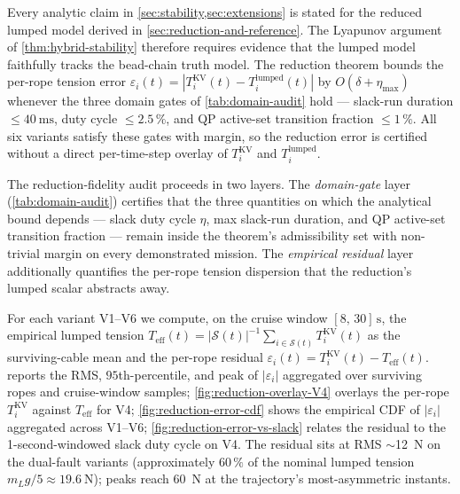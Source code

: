 Every analytic claim in \cref{sec:stability,sec:extensions} is stated for the reduced lumped model derived in \cref{sec:reduction-and-reference}. The Lyapunov argument of \cref{thm:hybrid-stability} therefore requires evidence that the lumped model faithfully tracks the bead-chain truth model. The reduction theorem bounds the per-rope tension error $\varepsilon_i(t) = |T_i^{\text{KV}}(t) - T_i^{\text{lumped}}(t)|$ by $O(\delta + \eta_{\max})$ whenever the three domain gates of \cref{tab:domain-audit} hold --- slack-run duration $\le\SI{40}{\milli\second}$, duty cycle $\le 2.5\,\%$, and QP active-set transition fraction $\le 1\,\%$. All six variants satisfy these gates with margin, so the reduction error is certified without a direct per-time-step overlay of $T_i^{\text{KV}}$ and $T_i^{\text{lumped}}$.

The reduction-fidelity audit proceeds in two layers. The \emph{domain-gate} layer (\cref{tab:domain-audit}) certifies that the three quantities on which the analytical bound depends --- slack duty cycle $\eta$, max slack-run duration, and QP active-set transition fraction --- remain inside the theorem's admissibility set with non-trivial margin on every demonstrated mission. The \emph{empirical residual} layer additionally quantifies the per-rope tension dispersion that the reduction's lumped scalar abstracts away.

For each variant V1--V6 we compute, on the cruise window $[8,\,30]\,\si{\second}$, the empirical lumped tension $T_{\mathrm{eff}}(t) = |\mathcal{S}(t)|^{-1} \sum_{i\in\mathcal{S}(t)} T_i^{\mathrm{KV}}(t)$ as the surviving-cable mean and the per-rope residual $\varepsilon_i(t) = T_i^{\mathrm{KV}}(t) - T_{\mathrm{eff}}(t)$.  reports the RMS, $95$th-percentile, and peak of $|\varepsilon_i|$ aggregated over surviving ropes and cruise-window samples; \cref{fig:reduction-overlay-V4} overlays the per-rope $T_i^{\mathrm{KV}}$ against $T_{\mathrm{eff}}$ for V4; \cref{fig:reduction-error-cdf} shows the empirical CDF of $|\varepsilon_i|$ aggregated across V1--V6; \cref{fig:reduction-error-vs-slack} relates the residual to the 1-second-windowed slack duty cycle on V4. The residual sits at RMS $\sim$\SI{12}{\newton} on the dual-fault variants (approximately $60\,\%$ of the nominal lumped tension $m_L g / 5 \approx \SI{19.6}{\newton}$); peaks reach \SI{60}{\newton} at the trajectory's most-asymmetric instants.


